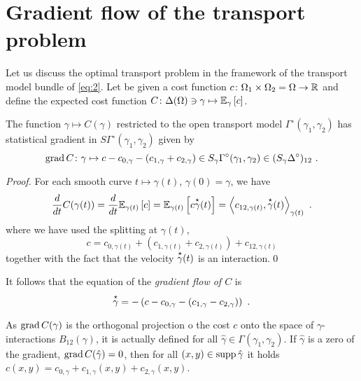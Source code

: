 \documentclass[runningheads]{llncs}
\begin{document}
\section{Gradient flow of the transport problem}

Let us discuss the optimal transport problem in the framework of the transport model bundle of \cref{eq:2}. Let be given a cost function $c \colon \Omega_1 \times \Omega_2 = \Omega \to \mathbb R$ and define the expected cost function $C \colon \Delta(\Omega)\ni \gamma \mapsto {\operatorname{\mathbb E}}_{\gamma}\left[c\right]$.

\begin{proposition}The function $\gamma \mapsto C(\gamma)$ restricted to the open transport model $\Gamma^\circ(\gamma_1,\gamma_2)$ has statistical gradient in $S\Gamma^\circ(\gamma_1,\gamma_2)$ given by
%
\begin{equation}\label{eq:gradient}
 \operatorname{grad} C \colon \gamma \mapsto c - c_{0,\gamma} - (c_{1,\gamma} + c_{2,\gamma}) \in S_\gamma\Gamma^\circ(\gamma_1,\gamma_2) \in (S_\gamma \Delta^\circ)_{12} \ . 
\end{equation}
\end{proposition}

\begin{proof}
For each smooth curve $t \mapsto \gamma(t)$, $\gamma(0) = \gamma$, we have 
\begin{equation*}
  \derivby t C(\gamma(t)) = \derivby t \expectat {\gamma(t)} c = \expectat {\gamma(t)} {c \velocity \gamma (t)} = \scalarat {\gamma(t)} {c_{12,\gamma(t)}} {\velocity \gamma(t)} \ .
\end{equation*}
where we have used the splitting at $\gamma(t)$,
\begin{equation*}
  c = c_{0,\gamma(t)} + (c_{1,\gamma(t)} + c_{2,\gamma(t)}) + c_{12,\gamma(t)}
\end{equation*}
together with the fact that the velocity $\overset{\star}{\gamma}(t)$ is an interaction.\qed \end{proof}

It follows that the equation of the \emph{gradient flow of $C$} is
%
\begin{equation*}
  \overset{\star}{\gamma} = - \left(c - c_{0,\gamma} - (c_{1,\gamma} - c_{2,\gamma})\right) \ .
\end{equation*}

As $\operatorname{grad} C(\gamma)$ is the orthogonal projection o the cost $c$ onto the space of $\gamma$-interactions $B_{12}(\gamma)$, it is actually defined for all $\hat \gamma \in \Gamma(\gamma_1,\gamma_2)$. If $\hat \gamma$ is a zero of the gradient,
$\operatorname{grad} C(\hat \gamma) = 0$, then for all $(x,y) \in \operatorname{supp}{\hat \gamma}$ it holds $c(x,y) = c_{0,\gamma} + c_{1,\gamma}(x,y) + c_{2,\gamma}(x,y)$.
\end{document}
